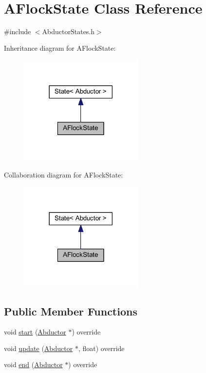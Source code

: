 \hypertarget{class_a_flock_state}{}\section{A\+Flock\+State Class Reference}
\label{class_a_flock_state}


{\ttfamily \#include $<$Abductor\+States.\+h$>$}



Inheritance diagram for A\+Flock\+State\+:
\nopagebreak
\begin{figure}[H]
\begin{center}
\leavevmode
\includegraphics[width=177pt]{class_a_flock_state__inherit__graph}
\end{center}
\end{figure}


Collaboration diagram for A\+Flock\+State\+:
\nopagebreak
\begin{figure}[H]
\begin{center}
\leavevmode
\includegraphics[width=177pt]{class_a_flock_state__coll__graph}
\end{center}
\end{figure}
\subsection*{Public Member Functions}
\begin{DoxyCompactItemize}
\item 
void \hyperlink{class_a_flock_state_a375255af2422bad8037325ea8ff86ddb}{start} (\hyperlink{class_abductor}{Abductor} $\ast$) override
\item 
void \hyperlink{class_a_flock_state_ac452fa27fac302918460575e5badae91}{update} (\hyperlink{class_abductor}{Abductor} $\ast$, float) override
\item 
void \hyperlink{class_a_flock_state_af81fa7c9e9eb5185e8cd950aceb758f3}{end} (\hyperlink{class_abductor}{Abductor} $\ast$) override
\end{DoxyCompactItemize}
